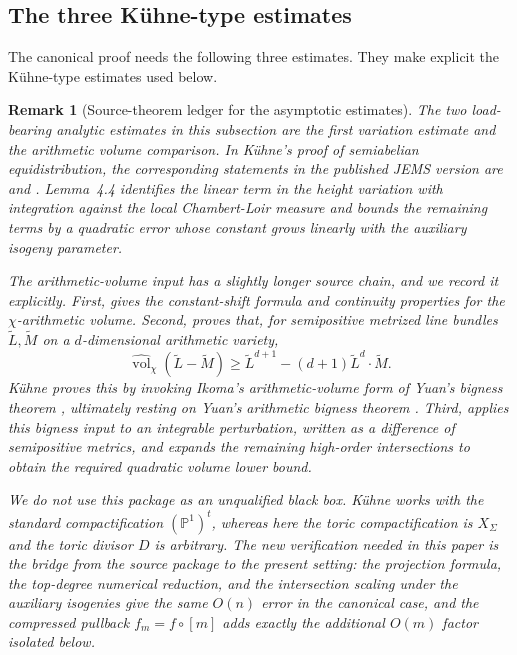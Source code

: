 \documentclass[10pt,a4paper]{amsart}
\theoremstyle{plain}
\newtheorem{remark}[theorem]{Remark}
\theoremstyle{plain}
\numberwithin{equation}{section}
\begin{document}
\subsection{The three K\"uhne-type estimates}

The canonical proof needs the following three estimates.  They make explicit
the K\"uhne-type estimates used below.

\begin{remark}[Source-theorem ledger for the asymptotic estimates]
	\label{rem:source-ledger-asymptotic}
	The two load-bearing analytic estimates in this subsection are the first
	variation estimate and the arithmetic volume comparison.  In K\"uhne's proof of
	semiabelian equidistribution, the corresponding statements in the published
	JEMS version are \cite[Lemma~4.4]{Ku1} and \cite[Lemma~4.6]{Ku1}.
	Lemma~4.4 identifies the linear
	term in the height variation with integration against the local
	Chambert-Loir measure and bounds the remaining terms by a quadratic error
	whose constant grows linearly with the auxiliary isogeny parameter.
	
	The arithmetic-volume input has a slightly longer source chain, and we record
	it explicitly.  First, \cite[Lemma~2.5(a),(b)]{Ku1} gives the constant-shift
	formula and continuity properties for the \(\chi\)-arithmetic volume.  Second,
	\cite[Lemma~2.6]{Ku1} proves that, for semipositive metrized line bundles
	\(\widetilde L,\widetilde M\) on a \(d\)-dimensional arithmetic variety,
	\[
	\widehat{\operatorname{vol}}_\chi(\widetilde L-\widetilde M)
	\ge
	\widetilde L^{d+1}-(d+1)\widetilde L^d\cdot\widetilde M .
	\]
	K\"uhne proves this by invoking Ikoma's arithmetic-volume form of Yuan's
	bigness theorem \cite[Theorem 3.5.3 and Remark 3.5.4]{Iko13}, ultimately
	resting on Yuan's arithmetic bigness theorem \cite{Yua1}.  Third,
	\cite[Lemma~4.6]{Ku1} applies this bigness input to an integrable perturbation,
	written as a difference of semipositive metrics, and expands the remaining
	high-order intersections to obtain the required quadratic volume lower bound.
	
	We do not use this package as an unqualified black box.  K\"uhne works with the
	standard compactification \((\mathbb P^1)^t\), whereas here the toric
	compactification is \(X_\Sigma\) and the toric divisor \(D\) is arbitrary.  The
	new verification needed in this paper is the bridge from the source package to
	the present setting: the projection formula, the top-degree numerical reduction, and
	the intersection scaling under the auxiliary isogenies give the same \(O(n)\)
	error in the canonical case, and the compressed pullback \(f_m=f\circ[m]\)
	adds exactly the additional \(O(m)\) factor isolated below.
\end{remark}
\end{document}
